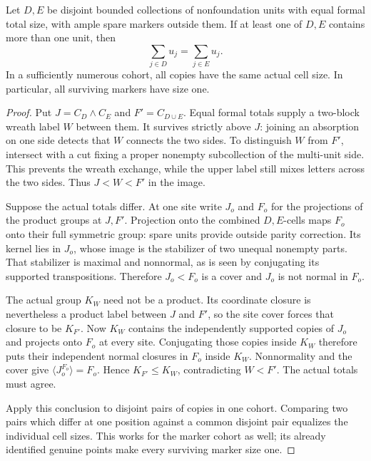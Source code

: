 \begin{proposition}\label{t:weighted-equal-totals}
Let \(D,E\) be disjoint bounded collections of nonfoundation units with
equal formal total size, with ample spare markers outside them.  If at least
one of \(D,E\) contains more than one unit, then
\[
 \sum_{j\in D}u_j=\sum_{j\in E}u_j.
\]
In a sufficiently numerous cohort, all copies have the same actual cell
size.  In particular, all surviving markers have size one.
\end{proposition}
\begin{proof}
Put \(J=C_D\wedge C_E\) and \(F'=C_{D\cup E}\).  Equal formal
totals supply a two-block wreath label \(W\) between them.  It
survives strictly above \(J\): joining an absorption on one side
detects that \(W\) connects the two sides.  To distinguish \(W\)
from \(F'\), intersect with a cut fixing a proper nonempty
subcollection of the multi-unit side.  This prevents the wreath
exchange, while the upper label still mixes letters across the two
sides.  Thus \(J<W<F'\) in the image.

Suppose the actual totals differ.  At one site write \(J_o\) and
\(F_o\) for the projections of the product groups at \(J,F'\).
Projection onto the combined \(D,E\)-cells maps \(F_o\) onto their
full symmetric group: spare units provide outside parity correction.
Its kernel lies in \(J_o\), whose image is the stabilizer of two
unequal nonempty parts.  That stabilizer is maximal and nonnormal,
as is seen by conjugating its supported transpositions.  Therefore
\(J_o<F_o\) is a cover and \(J_o\) is not normal in \(F_o\).

The actual group \(K_W\) need not be a product.  Its coordinate
closure is nevertheless a product label between \(J\) and \(F'\),
so the site cover forces that closure to be \(K_{F'}\).  Now
\(K_W\) contains the independently supported copies of \(J_o\)
and projects onto \(F_o\) at every site.  Conjugating those copies
inside \(K_W\) therefore puts their independent normal closures
in \(F_o\) inside \(K_W\).  Nonnormality and the cover give
\(\langle J_o^{F_o}\rangle=F_o\).  Hence
\(K_{F'}\le K_W\), contradicting \(W<F'\).  The actual totals
must agree.

Apply this conclusion to disjoint pairs of copies in one cohort.
Comparing two pairs which differ at one position against a common
disjoint pair equalizes the individual cell sizes.  This works for
the marker cohort as well; its already identified genuine points
make every surviving marker size one.
\end{proof}

